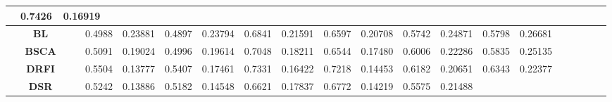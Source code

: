\documentclass[10pt,twocolumn,letterpaper]{article}
\begin{document}
\begin{table}
\begin{center}
\begin{tabular}{|c|c|c|c|c|c|c|c|c|c|c|c|c|c|c|c|c|c|c|c|c|c|c|c|c|||c|c|c|c|c|c|c|c|||}
&\multicolumn{2}{|c|}{0.7426}&\multicolumn{2}{|c|}{0.16919}%
\\
\hline
\multicolumn{4}{|c|}{\textbf{BL}~\cite{tong2015bootstrap}}
&\multicolumn{2}{|c|}{0.4988}&\multicolumn{2}{|c|}{0.23881}%
&\multicolumn{2}{|c|}{0.4897}&\multicolumn{2}{|c|}{0.23794}%
&\multicolumn{2}{|c|}{0.6841}&\multicolumn{2}{|c|}{0.21591}%
&\multicolumn{2}{|c|}{0.6597}&\multicolumn{2}{|c|}{0.20708}%
&\multicolumn{2}{|c|}{0.5742}&\multicolumn{2}{|c|}{0.24871}%
&\multicolumn{2}{|c|}{0.5798}&\multicolumn{2}{|c|}{0.26681}%
\\
\multicolumn{4}{|c|}{\textbf{BSCA}~\cite{qin2015saliency}}
&\multicolumn{2}{|c|}{0.5091}&\multicolumn{2}{|c|}{0.19024}%
&\multicolumn{2}{|c|}{0.4996}&\multicolumn{2}{|c|}{0.19614}%
&\multicolumn{2}{|c|}{0.7048}&\multicolumn{2}{|c|}{0.18211}%
&\multicolumn{2}{|c|}{0.6544}&\multicolumn{2}{|c|}{0.17480}%
&\multicolumn{2}{|c|}{0.6006}&\multicolumn{2}{|c|}{0.22286}%
&\multicolumn{2}{|c|}{0.5835}&\multicolumn{2}{|c|}{0.25135}%
\\
\multicolumn{4}{|c|}{\textbf{DRFI}~\cite{jiang2013salient}}
&\multicolumn{2}{|c|}{0.5504}&\multicolumn{2}{|c|}{0.13777}%
&\multicolumn{2}{|c|}{0.5407}&\multicolumn{2}{|c|}{0.17461}%
&\multicolumn{2}{|c|}{0.7331}&\multicolumn{2}{|c|}{0.16422}%
&\multicolumn{2}{|c|}{0.7218}&\multicolumn{2}{|c|}{0.14453}%
&\multicolumn{2}{|c|}{0.6182}&\multicolumn{2}{|c|}{0.20651}%
&\multicolumn{2}{|c|}{0.6343}&\multicolumn{2}{|c|}{0.22377}%
\\
\multicolumn{4}{|c|}{\textbf{DSR}~\cite{li2013saliency}}
&\multicolumn{2}{|c|}{0.5242}&\multicolumn{2}{|c|}{0.13886}%
&\multicolumn{2}{|c|}{0.5182}&\multicolumn{2}{|c|}{0.14548}%
&\multicolumn{2}{|c|}{0.6621}&\multicolumn{2}{|c|}{0.17837}%
&\multicolumn{2}{|c|}{0.6772}&\multicolumn{2}{|c|}{0.14219}%
&\multicolumn{2}{|c|}{0.5575}&\multicolumn{2}{|c|}{0.21488}%

\end{tabular}
\end{center}
\end{table}
\end{document}
